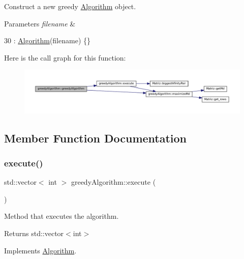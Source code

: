 Construct a new greedy \hyperlink{classAlgorithm}{Algorithm} object. 


\begin{DoxyParams}{Parameters}
{\em filename} & \\
\hline
\end{DoxyParams}

\begin{DoxyCode}
30 : \hyperlink{classAlgorithm_a89df1d2c6751f70733f38daa0ee2a13b}{Algorithm}(filename) \{\}
\end{DoxyCode}
Here is the call graph for this function\+:\nopagebreak
\begin{figure}[H]
\begin{center}
\leavevmode
\includegraphics[width=350pt]{classgreedyAlgorithm_acd4c3a073c8ed2e93bbf402363ebd71d_cgraph}
\end{center}
\end{figure}


\subsection{Member Function Documentation}
\mbox{\label{classgreedyAlgorithm_a37c81600b24a32ae25b6f0eeab643a7a}} 
\subsubsection{\texorpdfstring{execute()}{execute()}}
{\footnotesize\ttfamily std\+::vector$<$ int $>$ greedy\+Algorithm\+::execute (\begin{DoxyParamCaption}{ }\end{DoxyParamCaption})\hspace{0.3cm}{\ttfamily [virtual]}}



Method that executes the algorithm. 

\begin{DoxyReturn}{Returns}
std\+::vector$<$int$>$ 
\end{DoxyReturn}


Implements \hyperlink{classAlgorithm_af6ea9eb9a6dbd41896e3fd7dabac096b}{Algorithm}.


